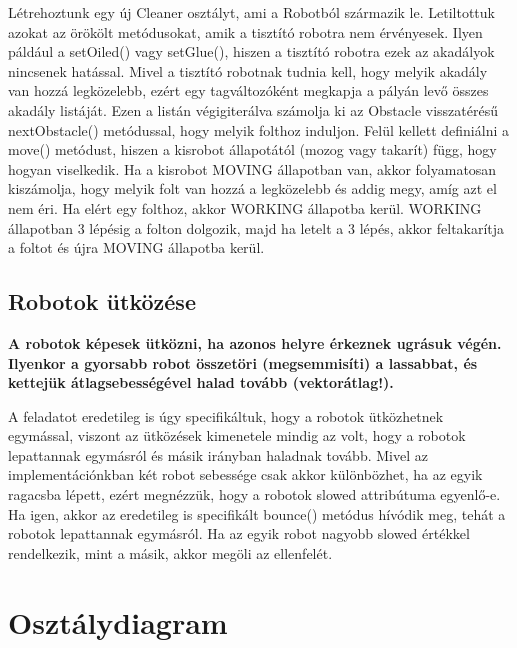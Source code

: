 Létrehoztunk egy új Cleaner osztályt, ami a Robotból származik le. Letiltottuk azokat az örökölt metódusokat, amik a tisztító robotra nem érvényesek. Ilyen páldául a setOiled() vagy setGlue(), hiszen a tisztító robotra ezek az akadályok nincsenek hatással. Mivel a tisztító robotnak tudnia kell, hogy melyik akadály van hozzá legközelebb, ezért egy tagváltozóként megkapja a pályán levő összes akadály listáját. Ezen a listán végigiterálva számolja ki az Obstacle visszatérésű nextObstacle() metódussal, hogy melyik folthoz induljon. Felül kellett definiálni a move() metódust, hiszen a kisrobot állapotától (mozog vagy takarít) függ, hogy hogyan viselkedik. Ha a kisrobot MOVING állapotban van, akkor folyamatosan kiszámolja, hogy melyik folt van hozzá a legközelebb és addig megy, amíg azt el nem éri. Ha elért egy folthoz, akkor WORKING állapotba kerül. WORKING állapotban 3 lépésig a folton dolgozik, majd ha letelt a 3 lépés, akkor feltakarítja a foltot és újra MOVING állapotba kerül. 

\subsection{Robotok ütközése}
\textbf{A robotok képesek ütközni, ha azonos helyre érkeznek ugrásuk végén. Ilyenkor a gyorsabb robot összetöri (megsemmisíti) a lassabbat, és kettejük átlagsebességével halad tovább (vektorátlag!).}

A feladatot eredetileg is úgy specifikáltuk, hogy a robotok ütközhetnek egymással, viszont az ütközések kimenetele mindig az volt, hogy a robotok lepattannak egymásról és másik irányban haladnak tovább. Mivel az implementációnkban két robot sebessége csak akkor különbözhet, ha az egyik ragacsba lépett, ezért megnézzük, hogy a robotok slowed attribútuma egyenlő-e. Ha igen, akkor az eredetileg is specifikált bounce() metódus hívódik meg, tehát a robotok lepattannak egymásról. Ha az egyik robot nagyobb slowed értékkel rendelkezik, mint a másik, akkor megöli az ellenfelét.


\pagebreak

\section{Osztálydiagram}

